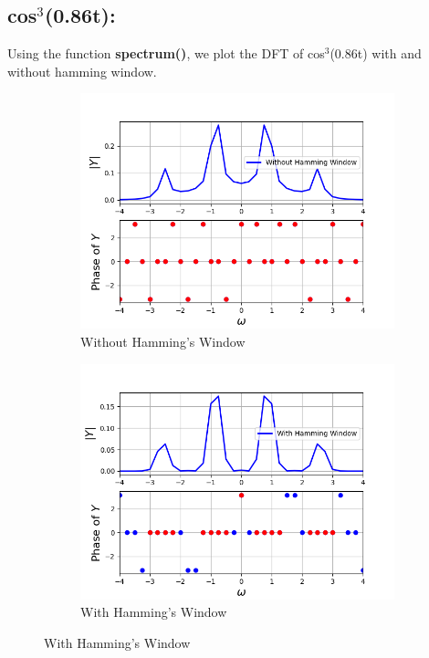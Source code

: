 \documentclass[12pt, a4paper]{report}
\begin{document}
\subsection{cos$^3$(0.86t):}
Using the function \textbf{spectrum()}, we plot the DFT of cos$^3$(0.86t) with and without hamming window.

\begin{figure}[h!]

\begin{subfigure}{0.55\textwidth}
    \centering
    \includegraphics[scale=0.9,width=\linewidth]{fig2.png} 
    \caption{Without Hamming's Window}
    \label{fig:my_label}
\end{subfigure}
\begin{subfigure}{0.55\textwidth}
    \centering
    \includegraphics[scale=0.9,width=\linewidth]{fig3.png} 
    \caption{With Hamming's Window}
    \label{fig:image2}
\end{subfigure}


\end{figure}
\vspace{100mm}
\end{document}
